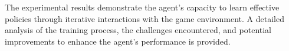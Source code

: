 The experimental results demonstrate the agent’s capacity to learn effective policies through iterative interactions with the game environment. A detailed analysis of the training process, the challenges encountered, and potential improvements to enhance the agent’s performance is provided. 

